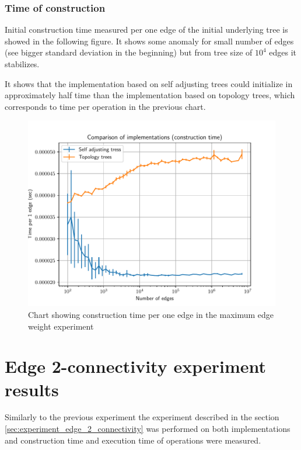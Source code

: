 \vfill\eject %

\subsubsection{Time of construction}

Initial construction time measured per one edge of the initial underlying tree
is showed in the following figure. It shows some anomaly for small number of
edges (see bigger standard deviation in the beginning) but from tree size of
$10^4$ edges it stabilizes.

It shows that the implementation based on self adjusting trees could initialize
in approximately half time than the implementation based on topology trees,
which corresponds to time per operation in the previous chart.

\begin{figure}[H]
\centering
{}\hsize
\includegraphics[width=\hsize]{charts/maximum_edge_weight_construction.pdf}
\caption{Chart showing construction time per one edge in the maximum edge weight
experiment}
\end{figure}

\vfill\eject %

\section{Edge 2-connectivity experiment results}

Similarly to the previous experiment the experiment described in the section
\ref{sec:experiment_edge_2_connectivity} was performed on both implementations
and construction time and execution time of operations were measured.

